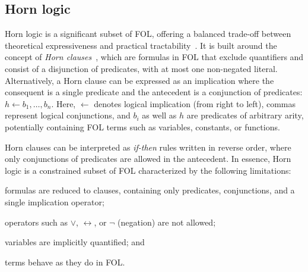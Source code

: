 \subsection{Horn logic}\label{subsec:horn-logic}
%
Horn logic is a significant subset of \gls{FOL}, offering a balanced trade-off between theoretical expressiveness and practical tractability~\cite{DBLP:journals/jcss/Makowsky87}.
%
It is built around the concept of \emph{Horn clauses}~\cite{DBLP:journals/jsyml/Horn51}, which are formulas in \gls{FOL} that exclude quantifiers and consist of a disjunction of predicates, with at most one non-negated literal.
%
Alternatively, a Horn clause can be expressed as an implication where the consequent is a single predicate and the antecedent is a conjunction of predicates: \(h \gets b_1, \dots, b_n\).
%
Here, \(\gets\) denotes logical implication (from right to left), commas represent logical conjunctions, and \(b_i\) as well as \(h\) are predicates of arbitrary arity, potentially containing \gls{FOL} terms such as variables, constants, or functions.

Horn clauses can be interpreted as \emph{if-then} rules written in reverse order, where only conjunctions of predicates are allowed in the antecedent.
%
In essence, Horn logic is a constrained subset of \gls{FOL} characterized by the following limitations:
%
\begin{inlinelist}
%
    \item formulas are reduced to clauses, containing only predicates, conjunctions, and a single implication operator;
    \item operators such as \(\lor\), \(\leftrightarrow\), or \(\neg\) (negation) are not allowed;
    \item variables are implicitly quantified; and
    \item terms behave as they do in \gls{FOL}.
\end{inlinelist}


